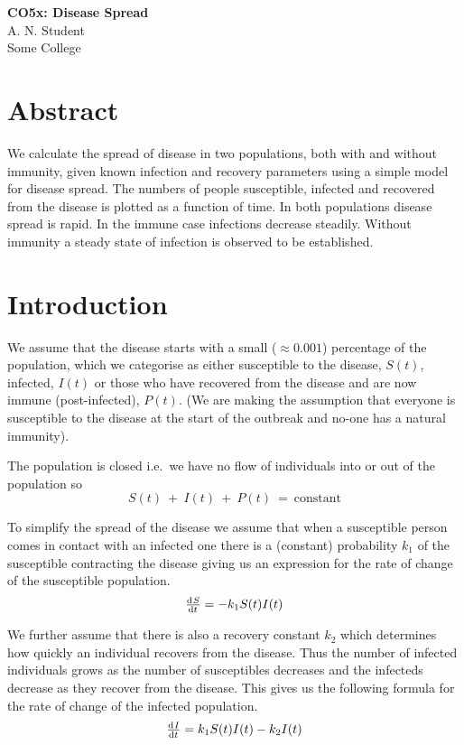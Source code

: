\documentclass[a4paper,11pt]{article}
\begin{document}
\begin{center}
\Large{\textbf{CO5x: Disease Spread}}\\ 
\vspace{1em}
\large{A. N. Student}\\
\large{Some College}
\end{center}

\section{Abstract}

We calculate the spread of disease in two populations, both with and without immunity, 
given known infection and recovery parameters using a simple model for disease spread.
The numbers of people susceptible, infected and recovered from the disease is plotted 
as a function of time. In both populations disease spread is rapid. In the immune case 
infections decrease steadily. Without immunity a steady state of infection is observed to be established.

\section{Introduction}

We assume that the disease starts with a small ($\approx 0.001$) percentage 
of the population, which we categorise as either susceptible to the disease, 
$S(t)$, infected, $I(t)$ or those who have recovered from the disease and 
are now immune (post-infected), $P(t)$. (We are making the assumption that everyone is 
susceptible to the disease at the start of the outbreak and no-one has a 
natural immunity).

The population is closed i.e.\ we have no flow of individuals into or out of the 
population so 
\begin{equation}
   S(t)\ +\ I(t)\ +\ P(t)\ =\ \text{constant}
\end{equation}

To simplify the spread of the disease we assume that when a susceptible person
comes in contact with an infected one there is a (constant) probability $k_1$ of 
the susceptible contracting the disease giving us an expression for the rate of 
change of the susceptible population.
\begin{equation}
\od{S}{t} = -k_1S(t)I(t)
\end{equation}
 
We further assume that there is also a recovery constant $k_2$ which determines 
how quickly an individual recovers from the disease. Thus the number of infected
individuals grows as the number of susceptibles decreases and the infecteds 
decrease as they recover from the disease. This gives us the following formula 
for the rate of change of the infected population.
\begin{equation}
\od{I}{t} = k_1S(t)I(t) - k_2I(t)
\end{equation}
\end{document}
